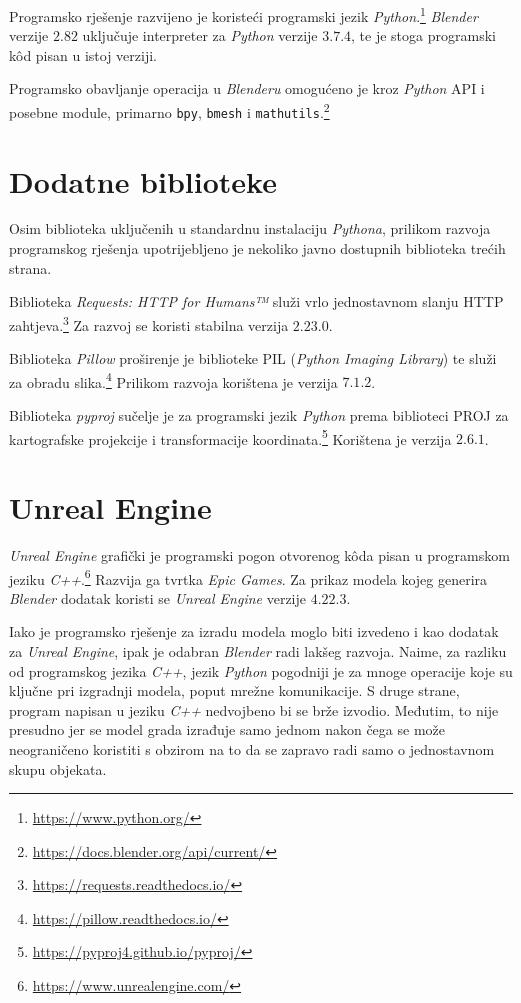 \documentclass[times, utf8, zavrsni, numeric]{fer}
\begin{document}
		Programsko rješenje razvijeno je koristeći programski jezik \textit{Python}.\footnote{\url{https://www.python.org/}}
		\textit{Blender} verzije $2.82$ uključuje interpreter za \textit{Python} verzije $3.7.4$, te je stoga programski kôd pisan u istoj verziji.
		
		Programsko obavljanje operacija u \textit{Blenderu} omogućeno je kroz \textit{Python} API i posebne module, primarno \texttt{bpy}, \texttt{bmesh} i \texttt{mathutils}.\footnote{\url{https://docs.blender.org/api/current/}}
	
	
	
	\section{Dodatne biblioteke} \label{custom_libraries}
	
		Osim biblioteka uključenih u standardnu instalaciju \textit{Pythona}, prilikom razvoja programskog rješenja upotrijebljeno je nekoliko javno dostupnih biblioteka trećih strana.
		
		Biblioteka \textit{Requests: HTTP for Humans™} služi vrlo jednostavnom slanju HTTP zahtjeva.\footnote{\url{https://requests.readthedocs.io/}}
		Za razvoj se koristi stabilna verzija $2.23.0$.
		
		Biblioteka \textit{Pillow} proširenje je biblioteke PIL (\textit{Python Imaging Library}) te služi za obradu slika.\footnote{\url{https://pillow.readthedocs.io/}}
		Prilikom razvoja korištena je verzija $7.1.2$.
	
		Biblioteka \textit{pyproj} sučelje je za programski jezik \textit{Python} prema biblioteci PROJ za kartografske projekcije i transformacije koordinata.\footnote{\url{https://pyproj4.github.io/pyproj/}}
		Korištena je verzija $2.6.1$.
	
	
	
	\section{Unreal Engine}

		\textit{Unreal Engine} grafički je programski pogon otvorenog kôda pisan u programskom jeziku \textit{C++}.\footnote{\url{https://www.unrealengine.com/}}
		Razvija ga tvrtka \textit{Epic Games}.
		Za prikaz modela kojeg generira \textit{Blender} dodatak koristi se \textit{Unreal Engine} verzije $4.22.3$.
		
		Iako je programsko rješenje za izradu modela moglo biti izvedeno i kao dodatak za \textit{Unreal Engine}, ipak je odabran \textit{Blender} radi lakšeg razvoja.
		Naime, za razliku od programskog jezika \textit{C++}, jezik \textit{Python} pogodniji je za mnoge operacije koje su ključne pri izgradnji modela, poput mrežne komunikacije.
		S druge strane, program napisan u jeziku \textit{C++} nedvojbeno bi se brže izvodio.
		Međutim, to nije presudno jer se model grada izrađuje samo jednom nakon čega se može neograničeno koristiti s obzirom na to da se zapravo radi samo o jednostavnom skupu objekata.
\end{document}
